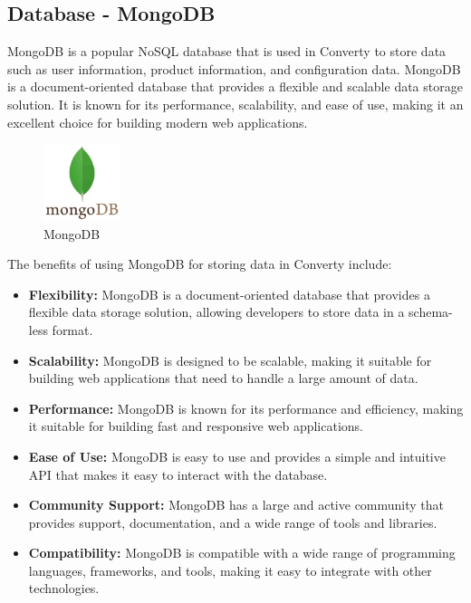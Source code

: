 \subsection{Database - MongoDB}
MongoDB is a popular NoSQL database that is used in Converty to store data such as user information, product information, and configuration data. MongoDB is a document-oriented database that provides a flexible and scalable data storage solution. It is known for its performance, scalability, and ease of use, making it an excellent choice for building modern web applications.

\begin{figure}[H]
    \centering
    \includegraphics[width=0.2\textwidth]{Images/mongodb2.png}
    \caption{MongoDB}
    \label{fig:mongodb}
\end{figure}

The benefits of using MongoDB for storing data in Converty include:

\begin{itemize}
    \item \textbf{Flexibility:} MongoDB is a document-oriented database that provides a flexible data storage solution, allowing developers to store data in a schema-less format.
    \item \textbf{Scalability:} MongoDB is designed to be scalable, making it suitable for building web applications that need to handle a large amount of data.
    \item \textbf{Performance:} MongoDB is known for its performance and efficiency, making it suitable for building fast and responsive web applications.
    \item \textbf{Ease of Use:} MongoDB is easy to use and provides a simple and intuitive API that makes it easy to interact with the database.
    \item \textbf{Community Support:} MongoDB has a large and active community that provides support, documentation, and a wide range of tools and libraries.
    \item \textbf{Compatibility:} MongoDB is compatible with a wide range of programming languages, frameworks, and tools, making it easy to integrate with other technologies.
\end{itemize}

